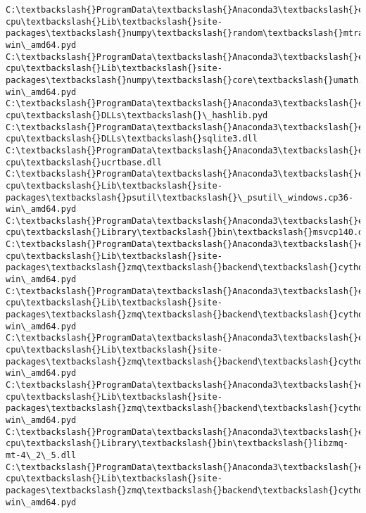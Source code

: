 \documentclass[11pt]{article}
\begin{document}
\begin{Verbatim}[commandchars=\\\{\}]
C:\textbackslash{}ProgramData\textbackslash{}Anaconda3\textbackslash{}envs\textbackslash{}fastai-cpu\textbackslash{}Lib\textbackslash{}site-packages\textbackslash{}numpy\textbackslash{}random\textbackslash{}mtrand.cp36-win\_amd64.pyd
C:\textbackslash{}ProgramData\textbackslash{}Anaconda3\textbackslash{}envs\textbackslash{}fastai-cpu\textbackslash{}Lib\textbackslash{}site-packages\textbackslash{}numpy\textbackslash{}core\textbackslash{}umath.cp36-win\_amd64.pyd
C:\textbackslash{}ProgramData\textbackslash{}Anaconda3\textbackslash{}envs\textbackslash{}fastai-cpu\textbackslash{}DLLs\textbackslash{}\_hashlib.pyd
C:\textbackslash{}ProgramData\textbackslash{}Anaconda3\textbackslash{}envs\textbackslash{}fastai-cpu\textbackslash{}DLLs\textbackslash{}sqlite3.dll
C:\textbackslash{}ProgramData\textbackslash{}Anaconda3\textbackslash{}envs\textbackslash{}fastai-cpu\textbackslash{}ucrtbase.dll
C:\textbackslash{}ProgramData\textbackslash{}Anaconda3\textbackslash{}envs\textbackslash{}fastai-cpu\textbackslash{}Lib\textbackslash{}site-packages\textbackslash{}psutil\textbackslash{}\_psutil\_windows.cp36-win\_amd64.pyd
C:\textbackslash{}ProgramData\textbackslash{}Anaconda3\textbackslash{}envs\textbackslash{}fastai-cpu\textbackslash{}Library\textbackslash{}bin\textbackslash{}msvcp140.dll
C:\textbackslash{}ProgramData\textbackslash{}Anaconda3\textbackslash{}envs\textbackslash{}fastai-cpu\textbackslash{}Lib\textbackslash{}site-packages\textbackslash{}zmq\textbackslash{}backend\textbackslash{}cython\textbackslash{}\_device.cp36-win\_amd64.pyd
C:\textbackslash{}ProgramData\textbackslash{}Anaconda3\textbackslash{}envs\textbackslash{}fastai-cpu\textbackslash{}Lib\textbackslash{}site-packages\textbackslash{}zmq\textbackslash{}backend\textbackslash{}cython\textbackslash{}\_poll.cp36-win\_amd64.pyd
C:\textbackslash{}ProgramData\textbackslash{}Anaconda3\textbackslash{}envs\textbackslash{}fastai-cpu\textbackslash{}Lib\textbackslash{}site-packages\textbackslash{}zmq\textbackslash{}backend\textbackslash{}cython\textbackslash{}\_version.cp36-win\_amd64.pyd
C:\textbackslash{}ProgramData\textbackslash{}Anaconda3\textbackslash{}envs\textbackslash{}fastai-cpu\textbackslash{}Lib\textbackslash{}site-packages\textbackslash{}zmq\textbackslash{}backend\textbackslash{}cython\textbackslash{}utils.cp36-win\_amd64.pyd
C:\textbackslash{}ProgramData\textbackslash{}Anaconda3\textbackslash{}envs\textbackslash{}fastai-cpu\textbackslash{}Library\textbackslash{}bin\textbackslash{}libzmq-mt-4\_2\_5.dll
C:\textbackslash{}ProgramData\textbackslash{}Anaconda3\textbackslash{}envs\textbackslash{}fastai-cpu\textbackslash{}Lib\textbackslash{}site-packages\textbackslash{}zmq\textbackslash{}backend\textbackslash{}cython\textbackslash{}socket.cp36-win\_amd64.pyd

\end{Verbatim}
\end{document}
